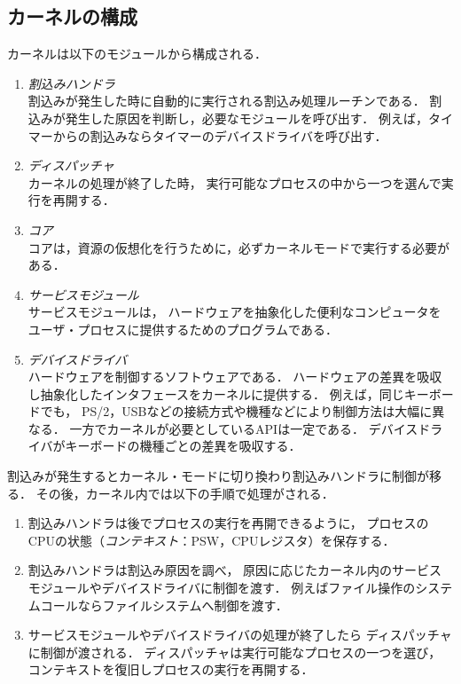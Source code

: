 \subsection{カーネルの構成}
カーネルは以下のモジュールから構成される．

\begin{enumerate}
\item \emph{割込みハンドラ} \\
  割込みが発生した時に自動的に実行される割込み処理ルーチンである．
  割込みが発生した原因を判断し，必要なモジュールを呼び出す．
  例えば，タイマーからの割込みならタイマーのデバイスドライバを呼び出す．
\item \emph{ディスパッチャ} \\
  カーネルの処理が終了した時，
  実行可能なプロセスの中から一つを選んで実行を再開する．
\item \emph{コア} \\
  コアは，資源の仮想化を行うために，必ずカーネルモードで実行する必要がある．
\item \emph{サービスモジュール} \\
  サービスモジュールは，
  ハードウェアを抽象化した便利なコンピュータを
  ユーザ・プロセスに提供するためのプログラムである．
\item \emph{デバイスドライバ} \\
  ハードウェアを制御するソフトウェアである．
  ハードウェアの差異を吸収し抽象化したインタフェースをカーネルに提供する．
  例えば，同じキーボードでも，
  PS/2，USBなどの接続方式や機種などにより制御方法は大幅に異なる．
  一方でカーネルが必要としているAPIは一定である．
  デバイスドライバがキーボードの機種ごとの差異を吸収する．
\end{enumerate}

割込みが発生するとカーネル・モードに切り換わり割込みハンドラに制御が移る．
その後，カーネル内では以下の手順で処理がされる．

\begin{enumerate}
\item 割込みハンドラは後でプロセスの実行を再開できるように，
  プロセスのCPUの状態（\emph{コンテキスト}：PSW，CPUレジスタ）を保存する．
\item 割込みハンドラは割込み原因を調べ，
  原因に応じたカーネル内のサービスモジュールやデバイスドライバに制御を渡す．
  例えばファイル操作のシステムコールならファイルシステムへ制御を渡す．
\item サービスモジュールやデバイスドライバの処理が終了したら
  ディスパッチャに制御が渡される．
  ディスパッチャは実行可能なプロセスの一つを選び，
  コンテキストを復旧しプロセスの実行を再開する．
\end{enumerate}

